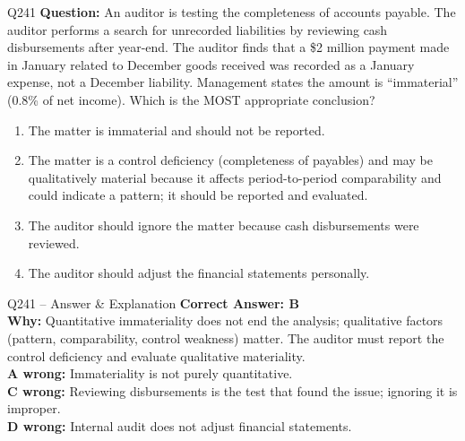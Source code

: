\documentclass[aspectratio=169,10pt]{beamer}
\begin{document}
	\begin{frame}[t]{Q241}
		\small
		\textbf{Question:} An auditor is testing the completeness of accounts payable. The auditor performs a search for unrecorded liabilities by reviewing cash disbursements after year-end. The auditor finds that a \$2 million payment made in January related to December goods received was recorded as a January expense, not a December liability. Management states the amount is ``immaterial'' (0.8\% of net income). Which is the MOST appropriate conclusion?
		\begin{enumerate}[label=\Alph*.,itemsep=1pt,topsep=2pt]
			\item The matter is immaterial and should not be reported.
			\item The matter is a control deficiency (completeness of payables) and may be qualitatively material because it affects period-to-period comparability and could indicate a pattern; it should be reported and evaluated.
			\item The auditor should ignore the matter because cash disbursements were reviewed.
			\item The auditor should adjust the financial statements personally.
		\end{enumerate}
	\end{frame}
	
	\begin{frame}[t]{Q241 -- Answer \& Explanation}
		\small
		\textbf{Correct Answer: B} \\[4pt]
		\textbf{Why:} Quantitative immateriality does not end the analysis; qualitative factors (pattern, comparability, control weakness) matter. The auditor must report the control deficiency and evaluate qualitative materiality. \\[4pt]
		\textbf{A wrong:} Immateriality is not purely quantitative. \\[2pt]
		\textbf{C wrong:} Reviewing disbursements is the test that found the issue; ignoring it is improper. \\[2pt]
		\textbf{D wrong:} Internal audit does not adjust financial statements.
	\end{frame}
	
\end{document}
